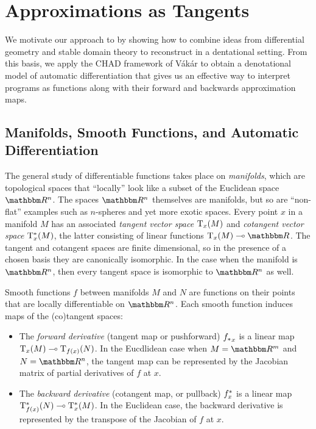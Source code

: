 \section{Approximations as Tangents}

We motivate our approach to \GPS by showing how to combine ideas from differential geometry and stable domain theory to reconstruct \GPS in a dentational setting. From this basis, we apply the CHAD framework of V{\'a}k{\'a}r \etal to obtain a denotational model of automatic differentiation that gives us an effective way to interpret programs as functions along with their forward and backwards approximation maps.

\subsection{Manifolds, Smooth Functions, and Automatic Differentiation}


The general study of differentiable functions takes place on \emph{manifolds}, which are topological spaces that ``locally'' look like a subset of the Euclidean space $\RR^n$. The spaces $\RR^n$ themselves are manifolds, but so are ``non-flat'' examples such as $n$-spheres and yet more exotic spaces. Every point $x$ in a manifold $M$ has an associated \emph{tangent vector space} $\mathrm{T}_x(M)$ and \emph{cotangent vector space} $\mathrm{T}^*_x(M)$, the latter consisting of linear functions $\tangents_x(M) \linearto \RR$. The tangent and cotangent spaces are finite dimensional, so in the presence of a chosen basis they are canonically isomorphic. In the case when the manifold is $\RR^n$, then every tangent space is isomorphic to $\RR^n$ as well.

Smooth functions $f$ between manifolds $M$ and $N$ are functions on their points that are locally differentiable on $\RR^n$. Each smooth function induces maps of the (co)tangent spaces:
\begin{itemize}
\item The \emph{forward derivative} (tangent map or pushforward) ${f_{*}}_x$ is a linear map $\mathrm{T}_x(M) \multimap \mathrm{T}_{f(x)}(N)$. In the Eucdlidean case when $M = \RR^m$ and $N = \RR^n$, the tangent map can be represented by the Jacobian matrix of partial derivatives of $f$ at $x$.
\item The \emph{backward derivative} (cotangent map, or pullback) $f^{*}_x$ is a linear map $\mathrm{T}^*_{f(x)}(N) \multimap \mathrm{T}^*_x(M)$. In the Euclidean case, the backward derivative is represented by the transpose of the Jacobian of $f$ at $x$.
\end{itemize}


